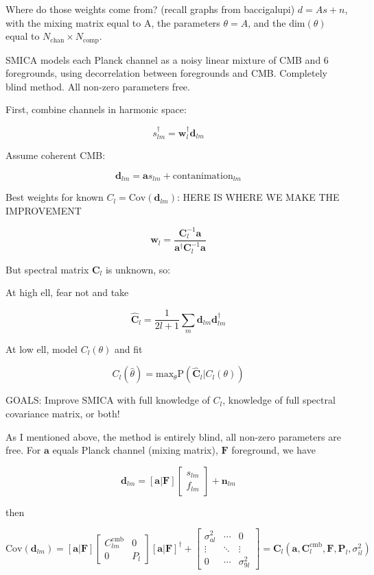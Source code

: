 \documentclass[a4paper, 11pt]{article}
\begin{document}
Where do those weights come from? (recall graphs from baccigalupi) $d=As+n$, with the mixing matrix equal to A, the parameters $\theta=A$, and the $\text{dim}(\theta)$ equal to $N_{\text{chan}}\times N_{\text{comp}}$. 

SMICA models each Planck channel as a noisy linear mixture of CMB and 6 foregrounds, using decorrelation between foregrounds and CMB. Completely blind method. All non-zero parameters free. 

First, combine channels in harmonic space: 

$$
s^{\dagger}_{lm}=\textbf{w}^{\dagger}_{l}\textbf{d}_{lm}
$$

Assume coherent CMB:

$$
\textbf{d}_{lm}=\textbf{a} s_{lm} +\text{contanimation}_{lm}
$$

Best weights for known $C_l=\text{Cov}(\textbf{d}_{lm})$: HERE IS WHERE WE MAKE THE IMPROVEMENT

$$
\textbf{w}_l=\frac{\textbf{C}^{-1}_{l}\textbf{a}}{\textbf{a}^{\dagger}\textbf{C}^{-1}_{l}\textbf{a}}
$$

But spectral matrix $\textbf{C}_l$ is unknown, so:

At high ell, fear not and take

$$
\hat{\textbf{C}}_l=\frac{1}{2l+1}\sum_{m}\textbf{d}_{lm}\textbf{d}^{\dagger}_{lm}
$$

At low ell, model $C_l(\theta)$ and fit

$$
C_l(\hat{\theta})=\text{max}_{\theta} \text{P}(\hat{\textbf{C}}_l \vert C_l(\theta))
$$

GOALS: Improve SMICA with full knowledge of $C_l$, knowledge of full spectral covariance matrix, or both!

As I mentioned above, the method is entirely blind, all non-zero parameters are free. For $\textbf{a}$ equals Planck channel (mixing matrix), $\textbf{F}$ foreground, we have 

$$
\textbf{d}_{lm} = [\textbf{a} \vert \textbf{F}] 
\begin{bmatrix} 
s_{lm}  \\ 
f_{lm}
\end{bmatrix} +\textbf{n}_{lm}
$$

then 

$$
\text{Cov}(\textbf{d}_{lm})= [\textbf{a} \vert \textbf{F}] 
\begin{bmatrix} 
C^{\text{cmb}}_{lm} & 0 \\ 
0 & P_l
\end{bmatrix}
[\textbf{a} \vert \textbf{F}]^{\dagger}
+ 
\begin{bmatrix}
\sigma^2_{al} & \cdots & 0 \\
\vdots & \ddots & \vdots \\
0 & \cdots & \sigma^2_{9l}
\end{bmatrix}
= \textbf{C}_l(\textbf{a}, \textbf{C}^{\text{cmb}}_l, \textbf{F}, \textbf{P}_l, \sigma^2_{il})
$$
\end{document}
